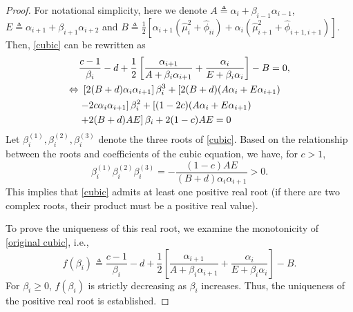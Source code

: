 \documentclass[lettersize,journal]{IEEEtran}
\theoremstyle{remark}
\begin{document}
\begin{proof}
	For notational simplicity, here we denote $A \triangleq \alpha_i+\beta_{i-1} \alpha_{i-1}$, $E \triangleq \alpha_{i+1}+\beta_{i+1}\alpha_{i+2}$ and $B \triangleq \frac{1}{2}\left[\alpha_{i+1}\left(\hat{\mu}_i^2+\hat{\phi}_{ii}\right)+\alpha_i \left(\hat{\mu}_{i+1}^2+\hat{\phi}_{i+1,i+1}\right)\right]$. Then, 
	\eqref{cubic} can be rewritten as
	\begin{align}
		&\frac{c-1}{\beta_i}-d+\frac{1}{2}\left[\frac{\alpha_{i+1}}{A+\beta_i\alpha_{i+1}}+\frac{\alpha_{i}}{E+\beta_i\alpha_{i}}\right]-B=0, \label{original cubic}\\
		\Leftrightarrow &~ \left[2(B+d)\alpha_i\alpha_{i+1}\right]\beta_{i}^3 +\left[2(B+d)(A\alpha_i+E\alpha_{i+1})\right. \notag\\
		&\left. -2c\alpha_i \alpha_{i+1}\right] \beta_{i}^2+\left[(1-2c)(A\alpha_i +E \alpha_{i+1})\right. \notag\\
		&\left. +2(B+d)AE\right]\beta_{i}+2(1-c)AE = 0 \label{simplify}
	\end{align}
	Let $\beta_i^{(1)}, \beta_i^{(2)}, \beta_i^{(3)}$ denote the three roots of \eqref{cubic}. Based on the relationship between the roots and coefficients of the cubic equation, we have, for $c>1$,
	\begin{equation}
		\beta_i^{(1)}\beta_i^{(2)}\beta_i^{(3)} = -\frac{(1-c)AE}{(B+d)\alpha_i\alpha_{i+1}}>0.
	\end{equation}
   This implies that \eqref{cubic} admits at least one positive real root (if there are two complex roots, their product must be a positive real value).
	
	To prove the uniqueness of this real root, we examine the monotonicity of  \eqref{original cubic}, i.e.,
	\begin{equation*}
		f(\beta_i) \triangleq \frac{c-1}{\beta_i}-d+\frac{1}{2}\left[\frac{\alpha_{i+1}}{A+\beta_i\alpha_{i+1}}+\frac{\alpha_{i}}{E+\beta_i\alpha_{i}}\right]-B.
	\end{equation*}
	  For \( \beta_i \geq 0 \), \( f(\beta_i) \) is strictly decreasing as \( \beta_i \) increases. Thus, the uniqueness of the positive real root is established.
\end{proof}
\end{document}
